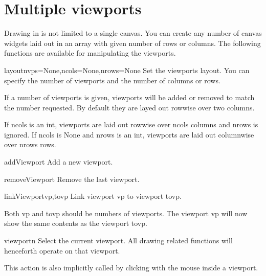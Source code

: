 \section{Multiple viewports}
\label{sec:multiple-viewports}

Drawing in \pyformex is not limited to a single canvas. You can create any number of canvas widgets laid out in an array with given number of rows or columns. The following functions are available for manipulating the viewports.

\begin{funcdesc}{layout}{nvps=None,ncols=None,nrows=None}
Set the viewports layout.
        You can specify the number of viewports and the number of columns or
        rows.

        If a number of viewports is given, viewports will be added
        or removed to match the number requested.
        By default they are layed out rowwise over two columns.

        If ncols is an int, viewports are laid out rowwise over ncols
        columns and nrows is ignored. If ncols is None and nrows is an int,
        viewports are laid out columnwise over nrows rows.
\end{funcdesc}

\begin{funcdesc}{addViewport}{}
Add a new viewport.
\end{funcdesc}

\begin{funcdesc}{removeViewport}{}
Remove the last viewport.
\end{funcdesc}

\begin{funcdesc}{linkViewport}{vp,tovp}
Link viewport vp to viewport tovp.

Both vp and tovp should be numbers of viewports. The viewport vp will now show the same contents as the viewport tovp.

\end{funcdesc}

\begin{funcdesc}{viewport}{n}
Select the current viewport. All drawing related functions will henceforth operate on that viewport. 

This action is also implicitly called by clicking with the mouse inside a viewport.
\end{funcdesc}



